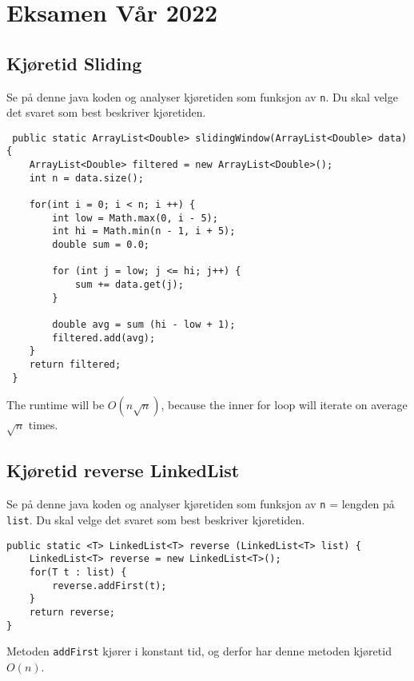 \documentclass{article}
\begin{document}
\section{Eksamen Vår 2022}
    \subsection{Kjøretid Sliding}

    Se på denne java koden og analyser kjøretiden som funksjon av \texttt{n}. Du skal velge det svaret som best beskriver kjøretiden.

    \begin{lstlisting}
 public static ArrayList<Double> slidingWindow(ArrayList<Double> data) {
    ArrayList<Double> filtered = new ArrayList<Double>();
    int n = data.size();

    for(int i = 0; i < n; i ++) {
        int low = Math.max(0, i - 5);
        int hi = Math.min(n - 1, i + 5);
        double sum = 0.0;
        
        for (int j = low; j <= hi; j++) {
            sum += data.get(j);
        }

        double avg = sum (hi - low + 1);
        filtered.add(avg);
    }
    return filtered;
 }
    \end{lstlisting}

    \begin{ans}
        The runtime will be \( O\left( n \sqrt{n} \right) \), because the inner for loop will iterate on average \( \sqrt{n} \) times.
    \end{ans}

\subsection{Kjøretid reverse LinkedList}
Se på denne java koden og analyser kjøretiden som funksjon av \texttt{n} = lengden på \texttt{list}. Du skal velge det svaret som best beskriver kjøretiden.

\begin{lstlisting}
public static <T> LinkedList<T> reverse (LinkedList<T> list) {
    LinkedList<T> reverse = new LinkedList<T>();
    for(T t : list) {
        reverse.addFirst(t);
    }
    return reverse;
}
\end{lstlisting}

\begin{ans}
    Metoden \texttt{addFirst} kjører i konstant tid, og derfor har denne metoden kjøretid \( O(n) \).
\end{ans}
\end{document}
